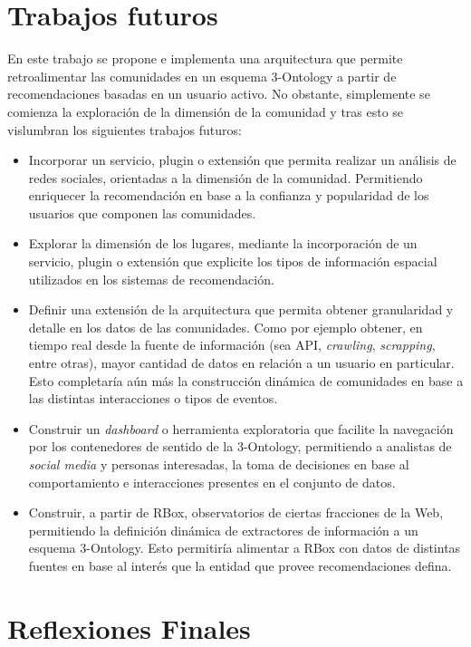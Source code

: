 \section{Trabajos futuros}

En este trabajo se propone e implementa una arquitectura que permite retroalimentar las comunidades en un esquema 3-Ontology a partir de recomendaciones basadas en un usuario activo.  No obstante, simplemente se comienza la exploración de la dimensión de la comunidad y tras esto se vislumbran los siguientes trabajos futuros:

\begin{itemize}
  \item Incorporar un servicio, plugin o extensión que permita realizar un análisis de redes sociales, orientadas a la dimensión de la comunidad. Permitiendo enriquecer la recomendación en base a la confianza y popularidad de los usuarios que componen las comunidades.
  \item Explorar la dimensión de los lugares, mediante la incorporación de un servicio, plugin o extensión que explicite los tipos de información espacial utilizados en los sistemas de recomendación.
  \item Definir una extensión de la arquitectura que permita obtener granularidad y detalle en los datos de las comunidades. Como por ejemplo obtener, en tiempo real desde la fuente de información (sea API, \textit{crawling}, \textit{scrapping}, entre otras), mayor cantidad de datos en relación a un usuario en particular. Esto completaría aún más la construcción dinámica de comunidades en base a las distintas interacciones o tipos de eventos.
  \item Construir un \textit{dashboard} o herramienta exploratoria que facilite la navegación por los contenedores de sentido de la 3-Ontology, permitiendo a analistas de \textit{social media} y personas interesadas, la toma de decisiones en base al comportamiento e interacciones presentes en el conjunto de datos.
  \item Construir, a partir de RBox, observatorios de ciertas fracciones de la Web, permitiendo la definición dinámica de extractores de información a un esquema 3-Ontology. Esto permitiría alimentar a RBox con datos de distintas fuentes en base al interés que la entidad que provee recomendaciones defina.
\end{itemize}

\section{Reflexiones Finales}


